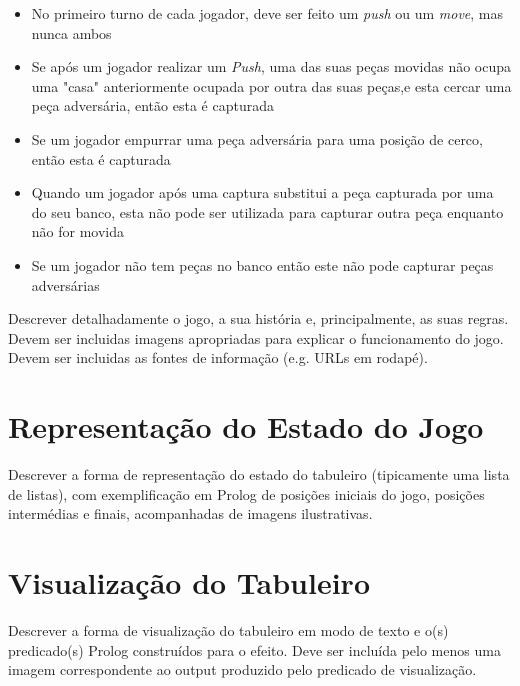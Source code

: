 \documentclass[a4paper]{article}
\begin{document}
\begin{itemize}
\begin{itemize}
\begin{itemize}
				\end{itemize}
			\end{itemize}
	\item No primeiro turno de cada jogador, deve ser feito um \textit{push} ou um \textit{move}, mas nunca ambos
	\item Se após um jogador realizar um \textit{Push}, uma das suas peças movidas não ocupa uma "casa" anteriormente ocupada por outra das suas peças,e esta cercar uma peça adversária, então esta é capturada
	\item Se um jogador empurrar uma peça adversária para uma posição de cerco, então esta é capturada
	\item Quando um jogador após uma captura substitui a peça capturada por uma do seu banco, esta não pode ser utilizada para capturar outra peça enquanto não for movida
	\item Se um jogador não tem peças no banco então este não pode capturar peças adversárias
\end{itemize}

Descrever detalhadamente o jogo, a sua história e, principalmente, as suas regras.
Devem ser incluidas imagens apropriadas para explicar o funcionamento do jogo.
Devem ser incluidas as fontes de informação (e.g. URLs em rodapé).


\section{Representação do Estado do Jogo}

Descrever a forma de representação do estado do tabuleiro (tipicamente uma lista de listas), com exemplificação em Prolog de posições iniciais do jogo, posições intermédias e finais, acompanhadas de imagens ilustrativas.


\section{Visualização do Tabuleiro}

Descrever a forma de visualização do tabuleiro em modo de texto e o(s) predicado(s) Prolog construídos para o efeito.
Deve ser incluída pelo menos uma imagem correspondente ao output produzido pelo predicado de visualização.
\end{document}
